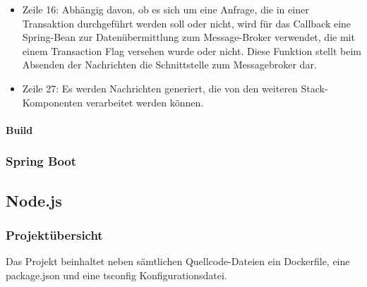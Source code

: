 \begin{itemize}
  \item Zeile 16: Abhängig davon, ob es sich um eine Anfrage, die in einer Transaktion durchgeführt werden soll oder nicht, wird für das Callback eine Spring-Bean zur Datenübermittlung zum Message-Broker verwendet, die mit einem Transaction Flag versehen wurde oder nicht. Diese Funktion stellt beim Absenden der Nachrichten die Schnittstelle zum Messagebroker dar.

  \item Zeile 27: Es werden Nachrichten generiert, die von den weiteren Stack-Komponenten verarbeitet werden können.

\end{itemize}



\paragraph{Build}





\subsubsection{Spring Boot}



\subsection{Node.js}


\subsubsection{Projektübersicht}
Das Projekt beinhaltet neben sämtlichen Quellcode-Dateien ein Dockerfile, eine package.json und eine tsconfig Konfigurationsdatei. 

